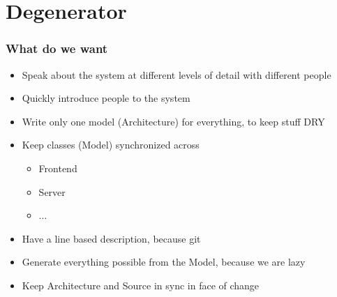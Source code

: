\documentclass[xelatex,10pt]{beamer}
\begin{document}
\section{Degenerator}
\begin{frame}
	\frametitle{What do we want}
	\begin{itemize}
		\item Speak about the system at different levels of detail
		with different people
		\item Quickly introduce people to the system
		\item Write only one model (Architecture) for everything, to keep stuff DRY
		\item Keep classes (Model) synchronized across
		\begin{itemize}
			\item Frontend
			\item Server
			\item \(\dots\)
		\end{itemize}
		\item Have a line based description, because git
		\item Generate everything possible from the Model, because we are lazy
		\item Keep Architecture and Source in sync in face of change
	\end{itemize}
\end{frame}
\end{document}
